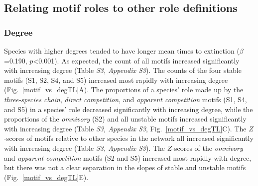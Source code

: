 \documentclass[12pt]{article}
\begin{document}
	\subsection*{Relating motif roles to other role definitions}

        \subsubsection*{Degree}
        
            Species with higher degrees tended to have longer mean times to extinction ($\beta$=0.190, $p$\textless0.001).
    		As expected, the count of all motifs increased significantly with increasing degree (Table \emph{S3, Appendix S3}).
    		The counts of the four stable motifs (S1, S2, S4, and S5) increased most rapidly with increasing degree (Fig.~\ref{motif_vs_degTL}A).
    		The proportions of a species' role made up by the \emph{three-species chain}, \emph{direct competition}, and \emph{apparent competition} motifs (S1, S4, and S5) in a species' role decreased significantly with increasing degree, while the proportions of the \emph{omnivory} (S2) and all unstable motifs increased significantly with increasing degree (Table \emph{S3, Appendix S3}, Fig.~\ref{motif_vs_degTL}C).
    		The $Z$-scores of motifs relative to other species in the network all increased significantly with increasing degree (Table \emph{S3, Appendix S3}).
            The $Z$-scores of the \emph{omnivory} and \emph{apparent competition} motifs (S2 and S5) increased most rapidly with degree, but there was not a clear separation in the slopes of stable and unstable motifs (Fig.~\ref{motif_vs_degTL}E).
\end{document}
